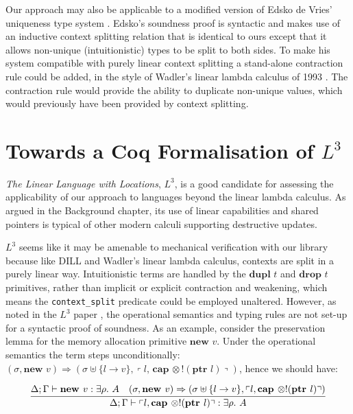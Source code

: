 \documentclass[]{unswthesis}
\newcommand{\Exists}[1]{\exists #1 \ldotp \,}
\newcommand{\types}{\vdash}
\newcommand{\steps}{\Rightarrow}
\newcommand{\ptr}[1]{\textbf{ptr $#1$}}
\newcommand{\capa}[1]{\textbf{cap $#1$}}
\newcommand{\lquine}{\left\ulcorner}
\newcommand{\rquine}{\right\urcorner}
\newcommand{\dupl}[1]{\textbf{dupl $#1$}}
\newcommand{\drop}[1]{\textbf{drop $#1$}}
\newcommand{\lnew}[1]{\textbf{new $#1$}}
\newcommand{\qpair}[2]{\lquine #1, #2 \rquine}
\let\c\texttt
\let\i\textit
\begin{document}
Our approach may also be applicable to a modified version of Edsko de Vries' uniqueness type system \cite{deVries07, deVriesPhD08}. Edsko's soundness proof is syntactic and makes use of an inductive context splitting relation that is identical to ours except that it allows non-unique (intuitionistic) types to be split to both sides. To make his system compatible with purely linear context splitting a stand-alone contraction rule could be added, in the style of Wadler's linear lambda calculus of 1993 \cite{wadler93}. The contraction rule would provide the ability to duplicate non-unique values, which would previously have been provided by context splitting.

\section{Towards a Coq Formalisation of $L^3$}
\label{towards-l3}

\i{The Linear Language with Locations}, $L^3$, is a good candidate for assessing the applicability of our approach to languages beyond the linear lambda calculus. As argued in the Background chapter, its use of linear capabilities and shared pointers is typical of other modern calculi supporting destructive updates.

$L^3$ seems like it may be amenable to mechanical verification with our library because like DILL and Wadler's linear lambda calculus, contexts are split in a purely linear way. Intuitionistic terms are handled by the $\dupl{t}$ and $\drop{t}$ primitives, rather than implicit or explicit contraction and weakening, which means the \c{context_split} predicate could be employed unaltered. However, as noted in the $L^3$ paper \cite{ahmed05}, the operational semantics and typing rules are not set-up for a syntactic proof of soundness. As an example, consider the preservation lemma for the memory allocation primitive $\lnew{v}$. Under the operational semantics the term steps unconditionally: $(\sigma, \lnew{v}) \steps (\sigma \uplus \{l \to v\}, \qpair{l}{\capa \otimes !(\ptr{l})})$, hence we should have:

\begin{eqnarray*}
\infer{\Delta; \Gamma \types \qpair{l}{\capa \otimes !(\ptr{l})} : \Exists{\rho} A}{
  \Delta; \Gamma \types \lnew{v} : \Exists{\rho} A  & (\sigma, \lnew{v}) \steps (\sigma \uplus \{l \to v\}, \qpair{l}{\capa \otimes !(\ptr{l})})
}
\end{eqnarray*}
\end{document}
